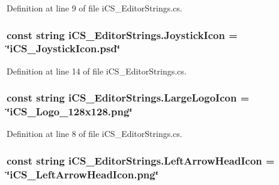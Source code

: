 Definition at line 9 of file i\+C\+S\+\_\+\+Editor\+Strings.\+cs.

\hypertarget{classi_c_s___editor_strings_a5f00276adc1da19e974696f84ea6e335}{
\subsubsection[{Joystick\+Icon}]{\setlength{\rightskip}{0pt plus 5cm}const string i\+C\+S\+\_\+\+Editor\+Strings.\+Joystick\+Icon = \char`\"{}i\+C\+S\+\_\+\+Joystick\+Icon.\+psd\char`\"{}}}\label{classi_c_s___editor_strings_a5f00276adc1da19e974696f84ea6e335}


Definition at line 14 of file i\+C\+S\+\_\+\+Editor\+Strings.\+cs.

\hypertarget{classi_c_s___editor_strings_add05885cd2ab8850fbd3587312154234}{
\subsubsection[{Large\+Logo\+Icon}]{\setlength{\rightskip}{0pt plus 5cm}const string i\+C\+S\+\_\+\+Editor\+Strings.\+Large\+Logo\+Icon = \char`\"{}i\+C\+S\+\_\+\+Logo\+\_\+128x128.\+png\char`\"{}}}\label{classi_c_s___editor_strings_add05885cd2ab8850fbd3587312154234}


Definition at line 8 of file i\+C\+S\+\_\+\+Editor\+Strings.\+cs.

\hypertarget{classi_c_s___editor_strings_a6f0e77119a660fffc6483faa2e0e80c3}{
\subsubsection[{Left\+Arrow\+Head\+Icon}]{\setlength{\rightskip}{0pt plus 5cm}const string i\+C\+S\+\_\+\+Editor\+Strings.\+Left\+Arrow\+Head\+Icon = \char`\"{}i\+C\+S\+\_\+\+Left\+Arrow\+Head\+Icon.\+png\char`\"{}}}\label{classi_c_s___editor_strings_a6f0e77119a660fffc6483faa2e0e80c3}


